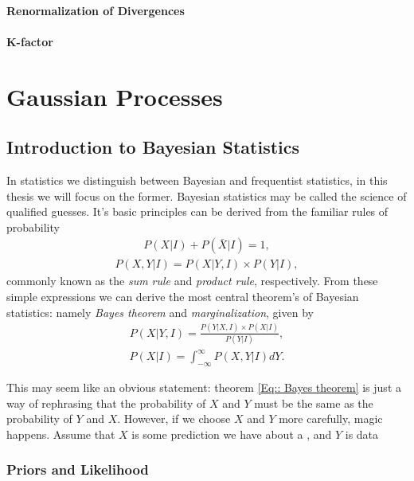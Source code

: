 \documentclass[twoside,english]{uiofysmaster}
\begin{document}
\subsubsection{Renormalization of Divergences}

\subsubsection{K-factor}



\chapter{Gaussian Processes}

\section{Introduction to Bayesian Statistics}

In statistics we distinguish between Bayesian and frequentist statistics, in this thesis we will focus on the former. Bayesian statistics may be called the science of qualified guesses. It's basic principles can be derived from the familiar rules of probability
\begin{align}\label{Eq:: Sum rule}
P(X | I) + P(\bar{X} | I) = 1,
\end{align}
\begin{align}\label{Eq:: Product rule}
P(X, Y | I) = P(X | Y, I) \times P(Y | I),
\end{align} 
commonly known as the \textit{sum rule} and \textit{product rule}, respectively. From these simple expressions we can derive the most central theorem's of Bayesian statistics: namely \textit{Bayes theorem} and \textit{marginalization}, given by
\begin{align}\label{Eq:: Bayes theorem}
P(X | Y, I) = \frac{P(Y | X, I) \times P(X | I)}{P(Y | I)},
\end{align}
\begin{align}
P(X | I) = \int_{- \infty}^{\infty} P(X, Y | I) d Y.
\end{align}

This may seem like an obvious statement: theorem \ref{Eq:: Bayes theorem} is just a way of rephrasing that the probability of $X$ and $Y$ must be the same as the probability of $Y$ and $X$. However, if we choose $X$ and $Y$ more carefully, magic happens. Assume that $X$ is some prediction we have about a , and $Y$ is data 

\subsection{Priors and Likelihood}
\end{document}
